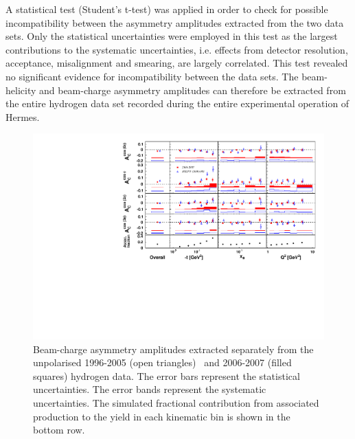 \documentclass[11pt,a4paper]{article}
\begin{document}
A statistical test (Student's t-test) was applied in order to check for possible incompatibility between the asymmetry amplitudes extracted from the two data sets. Only the statistical uncertainties were employed in this test as the largest contributions to the systematic uncertainties, i.e. effects from detector resolution, acceptance, misalignment and smearing, are largely correlated. This test revealed no significant evidence for incompatibility between the data sets. The beam-helicity and beam-charge asymmetry amplitudes can therefore be extracted from the entire hydrogen data set recorded during the entire experimental operation of H{\sc ermes}.
\begin{figure}
\begin{center}
 \includegraphics[width=15cm,keepaspectratio]{bca_sep}
  \caption{Beam-charge asymmetry amplitudes extracted separately from the unpolarised 1996-2005 (open triangles)~\cite{Air09} and 2006-2007 (filled squares) hydrogen data.
The error bars represent the statistical uncertainties. The error bands represent the systematic uncertainties. The simulated fractional contribution from associated production to the yield in each kinematic bin is shown in the bottom row.}
 \label{release_bca_0607}
\end{center}
 \end{figure}
\end{document}
